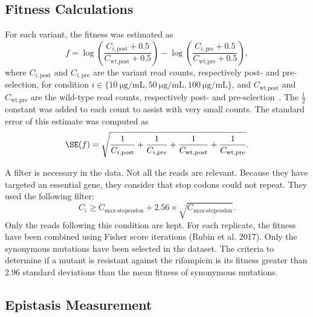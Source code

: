 \documentclass[12pt]{article}
\begin{document}
  \subsection{Fitness Calculations}

  For each variant, the fitness was estimated as 
  \begin{equation}\label{eq:fitnessscore}
    f = \log\left(\frac{C_{i, \text{post}} + 0.5}{C_{\text{wt}, \text{post}} +
    0.5}\right) - 
    \log\left(\frac{C_{i, \text{pre}} + 0.5}{C_{\text{wt}, \text{pre}} +
    0.5}\right),
  \end{equation}
  where $C_{i, \text{post}}$ and $C_{i, \text{pre}}$ are the variant read
  counts, respectively post- and pre-selection, for condition
  $i\in\{\SI{10}{\micro\gram\per\milli\liter},
  \SI{50}{\micro\gram\per\milli\liter},
  \SI{100}{\micro\gram\per\milli\liter}\}$, and $C_{\text{wt}, \text{post}}$
  and $C_{\text{wt}, \text{pre}}$ are the wild-type read counts, respectively
  post- and pre-selection~\cite{rubin2017}. The $\frac{1}{2}$ constant was
  added to each count to assist with very small counts. The standard error of
  this estimate was computed as
  \begin{equation}\label{eq:fitnesserror}
    \SE(f) = \sqrt{\frac{1}{C_{i, \text{post}}} + \frac{1}{C_{i, \text{pre}}} +
    \frac{1}{C_{\text{wt}, \text{post}}} + \frac{1}{C_{\text{wt},
    \text{pre}}}}.
  \end{equation}

  A filter is necessary in the data. Not all the reads are relevant. Because
  they have targeted an essential gene, they consider that stop codons could
  not repeat. They used the following filter:
  \begin{equation}\label{eq:stopfilter}
    C_{i} \geq C_{\text{max-stopcodon}} + 2.56 \times
    \sqrt{C_{\text{max-stopcodon}}}.
  \end{equation}
  Only the reads following this condition are kept. For each replicate, the
  fitness have been combined using Fisher score iterations (Rubin et al. 2017).
  Only the synonymous mutations have been selected in the dataset. The criteria
  to determine if a mutant is resistant against the rifampicin is its fitness
  greater than 2.96 standard deviations than the mean fitness of synonymous
  mutations.

  \subsection{Epistasis Measurement}
\end{document}
